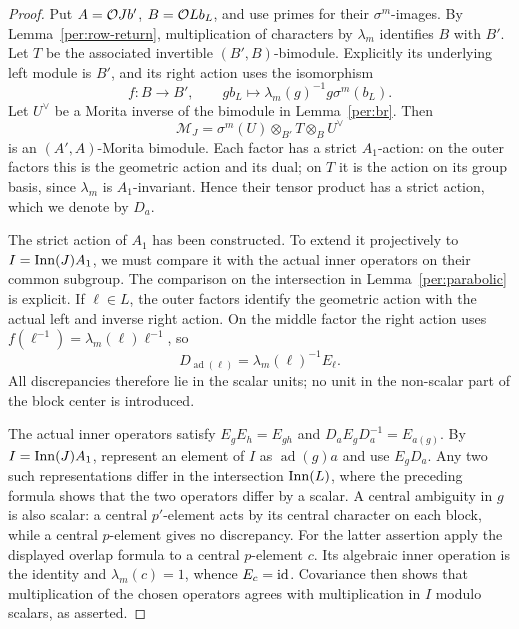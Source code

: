 \begin{proof}
Put $A=\mathcal O Jb'$, $B=\mathcal O Lb_L$, and use primes for their
$\sigma^m$-images.  By Lemma~\ref{per:row-return}, multiplication
of characters by $\lambda_m$ identifies $B$ with $B'$.
Let $T$ be the associated invertible $(B',B)$-bimodule.
Explicitly its underlying left module is $B'$, and its right action
uses the isomorphism
\[
 f:B\longrightarrow B',\qquad
        g b_L\longmapsto\lambda_m(g)^{-1}g\sigma^m(b_L).
\]
Let $U^\vee$ be a Morita inverse of the bimodule in
Lemma~\ref{per:br}.  Then
\[
 \mathcal M_J=
   \sigma^m(U)\otimes_{B'}T\otimes_B U^\vee
\]
is an $(A',A)$-Morita bimodule.  Each factor has a strict $A_1$-action:
on the outer factors this is the geometric action and its dual;
on $T$ it is the action on its group basis, since $\lambda_m$ is
$A_1$-invariant.  Hence their tensor product has a strict action,
which we denote by $D_a$.

The strict action of $A_1$ has been constructed.  To extend it
projectively to $I=\operatorname{Inn}(J)A_1$, we must compare it with the
actual inner operators on their common subgroup.
The comparison on the intersection in
Lemma~\ref{per:parabolic} is explicit.  If $\ell\in L$, the outer
factors identify the geometric action with the actual left and
inverse right action.  On the middle factor the right action uses
$f(\ell^{-1})=\lambda_m(\ell)\ell^{-1}$, so
\begin{equation}\label{per:overlap-scalar}
 D_{\operatorname{ad}(\ell)}
          =\lambda_m(\ell)^{-1}E_\ell.
\end{equation}
All discrepancies therefore lie in the scalar units; no unit in
the non-scalar part of the block center is introduced.

The actual inner operators satisfy
$E_gE_h=E_{gh}$ and
$D_aE_gD_a^{-1}=E_{a(g)}$.  By
$I=\operatorname{Inn}(J)A_1$, represent an element of $I$ as
$\operatorname{ad}(g)a$ and use $E_gD_a$.  Any two such
representations differ in the intersection $\operatorname{Inn}(L)$, where the
preceding formula shows that the two operators differ by a scalar.
A central ambiguity in $g$ is also scalar: a central $p'$-element
acts by its central character on each block, while a central
$p$-element gives no discrepancy.  For the latter assertion apply
the displayed overlap formula to a central $p$-element $c$.  Its
algebraic inner operation is the identity and
$\lambda_m(c)=1$, whence $E_c=\operatorname{id}$.  Covariance then shows that
multiplication of the chosen operators agrees with multiplication
in $I$ modulo scalars, as asserted.
\end{proof}

